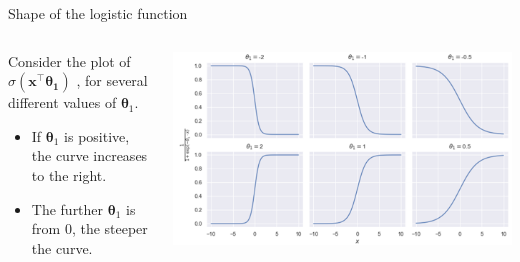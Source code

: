 \documentclass[aspectratio=169]{../latex_main/tntbeamer}  %
\begin{document}
	\begin{frame}{Shape of the logistic function}
	   
	   \begin{columns}
	    
	   \begin{column}{.4\textwidth}
	   Consider the plot of       $\sigma (\bm{x}^\intercal\bm{\theta_1})$      , for several different values of $\bm\theta_1$. 
	   \begin{itemize}
	       \item If $\bm\theta_1$ is positive, the curve increases to the right.
	       \item The further  $\bm\theta_1$ is from 0, the steeper the curve.
	   \end{itemize}
	   \end{column}
	    
	    \begin{column}{.6\textwidth}

	            \centering	            \includegraphics[width=\textwidth]{Bild10}
	            
	    \end{column}
	    
	    \end{columns}
	\end{frame}
	
\end{document}
